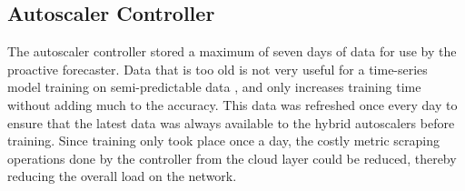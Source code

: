 \begin{center}
\begin{minipage}{\linewidth}
    \label{fig:lstm-final-data}
\end{minipage}
\end{center}

\subsection{Autoscaler Controller}
\label{subsec:ch4-auto-daemon-subsection}

The autoscaler controller stored a maximum of seven days of data for use by the proactive forecaster. Data that is too old is not very useful for a time-series model training on semi-predictable data \cite{greff2016lstm}, and only increases training time without adding much to the accuracy. This data was refreshed once every day to ensure that the latest data was always available to the hybrid autoscalers before training. Since training only took place once a day, the costly metric scraping operations done by the controller from the cloud layer could be reduced, thereby reducing the overall load on the network.\par

